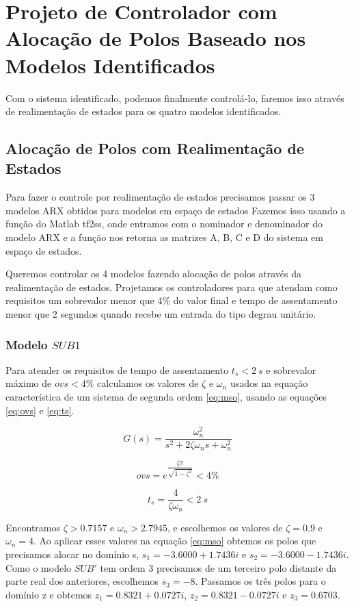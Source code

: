 \chapter{Projeto de Controlador com Alocação de Polos Baseado nos Modelos Identificados} \label{cap5}
Com o sistema identificado, podemos finalmente controlá-lo, faremos isso através de realimentação de estados para os quatro modelos identificados.

\section{Alocação de Polos com Realimentação de Estados} \label{s:ctrl}
Para fazer o controle por realimentação de estados precisamos passar os 3 modelos ARX obtidos para modelos em espaço de estados Fazemos isso usando a função do Matlab tf2ss, onde entramos com o nominador e denominador do modelo ARX e a função nos retorna as matrizes A, B, C e D do sistema em espaço de estados. 


Queremos controlar os 4 modelos fazendo alocação de polos através da realimentação de estados. Projetamos os controladores para que atendam como requisitos um sobrevalor menor que 4\% do valor final e tempo de assentamento menor que 2 segundos quando recebe um entrada do tipo degrau unitário.

\subsection{Modelo $SUB1$}\label{s:ctrlsub1}

Para atender os requisitos de tempo de assentamento $t_s<2 ~s$ e sobrevalor máximo de $ovs<4\%$ calculamos os valores de $\zeta$ e $\omega_n$ usados na equação característica de um sistema de segunda ordem \eqref{eq:mso}, usando as equações \eqref{eq:ovs} e \eqref{eq:ts}.

\begin{equation}\label{eq:mso}
G(s)=\dfrac{\omega_n^2}{s^2+2 \zeta \omega_n  s+ \omega_n^2}
\end{equation}

\begin{equation}\label{eq:ovs}
ovs=e^{\dfrac{\zeta \pi}{\sqrt{1-\zeta^2}}}<4\%
\end{equation}

\begin{equation}\label{eq:ts}
t_s=\dfrac{4}{\zeta \omega_n}<2~s
\end{equation}

Encontramos $\zeta>0.7157$ e $\omega_n>2.7945$, e escolhemos os valores de $\zeta=0.9$ e $\omega_n=4$. Ao aplicar esses valores na equação \eqref{eq:mso} obtemos os polos que precisamos alocar no domínio s, $s_1=-3.6000 + 1.7436i$ e $s_2=-3.6000 - 1.7436i$. Como o modelo $SUB'$ tem ordem 3 precisamos de um terceiro polo distante da parte real dos anteriores, escolhemos $s_3=-8$. Passamos os três polos para o domínio z e obtemos $z_1=0.8321 + 0.0727i$, $z_2=0.8321 - 0.0727i$ e $z_3=0.6703$. 


